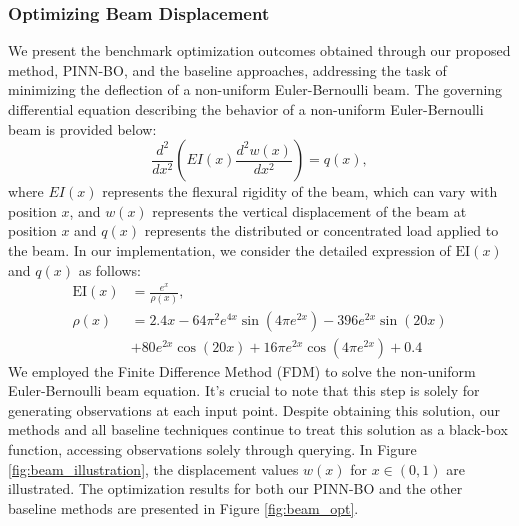 \subsubsection{Optimizing Beam Displacement}
We present the benchmark optimization outcomes obtained through our proposed method, PINN-BO, and the baseline approaches, addressing the task of minimizing the deflection of a non-uniform Euler-Bernoulli beam. The governing differential equation describing the behavior of a non-uniform Euler-Bernoulli beam is provided below: 
\begin{equation*}
    \frac{d^2}{dx^2} \left( EI(x) \frac{d^2 w(x)}{dx^2} \right) = q(x),
\end{equation*}
where
$EI(x)$ represents the flexural rigidity of the beam, which can vary with position $x$, and $w(x)$ represents the vertical displacement of the beam at position $x$ and 
$q(x)$ represents the distributed or concentrated load applied to the beam. 
In our implementation, we consider the detailed expression of $\text{EI}(x)$ and $q(x)$ as follows:
\begin{align*}
    \text{EI}(x) &= \frac{e^x}{\rho(x)},\\
    \rho(x) &= 2.4 x - 64 \pi^{2} e^{4 x} \sin{\left(4 \pi e^{2 x} \right)} - 396 e^{2 x} \sin{\left(20 x \right)} \\
    &+ 80 e^{2 x} \cos{\left(20 x \right)} + 16 \pi e^{2 x} \cos{\left(4 \pi e^{2 x} \right)} + 0.4
\end{align*}
We employed the Finite Difference Method (FDM) to solve the non-uniform Euler-Bernoulli beam equation. It's crucial to note that this step is solely for generating observations at each input point. Despite obtaining this solution, our methods and all baseline techniques continue to treat this solution as a black-box function, accessing observations solely through querying. In Figure \ref{fig:beam_illustration}, the displacement values $w(x)$ for $x \in (0,1)$ are illustrated. The optimization results for both our PINN-BO and the other baseline methods are presented in Figure \ref{fig:beam_opt}.
\clearpage
